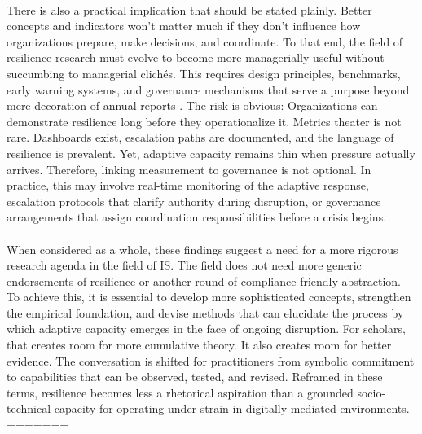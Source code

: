 \\
There is also a practical implication that should be stated plainly. Better concepts and indicators won't matter much if they don't influence how organizations prepare, make decisions, and coordinate. To that end, the field of resilience research must evolve to become more managerially useful without succumbing to managerial clichés. This requires design principles, benchmarks, early warning systems, and governance mechanisms that serve a purpose beyond mere decoration of annual reports \autocite{weick2011managing,lengnick2011developing,calder2021iso}. The risk is obvious: Organizations can demonstrate resilience long before they operationalize it. Metrics theater is not rare. Dashboards exist, escalation paths are documented, and the language of resilience is prevalent. Yet, adaptive capacity remains thin when pressure actually arrives. Therefore, linking measurement to governance is not optional. In practice, this may involve real-time monitoring of the adaptive response, escalation protocols that clarify authority during disruption, or governance arrangements that assign coordination responsibilities before a crisis begins.\\
\\
When considered as a whole, these findings suggest a need for a more rigorous research agenda in the field of IS. The field does not need more generic endorsements of resilience or another round of compliance-friendly abstraction. To achieve this, it is essential to develop more sophisticated concepts, strengthen the empirical foundation, and devise methods that can elucidate the process by which adaptive capacity emerges in the face of ongoing disruption. For scholars, that creates room for more cumulative theory. It also creates room for better evidence. The conversation is shifted for practitioners from symbolic commitment to capabilities that can be observed, tested, and revised. Reframed in these terms, resilience becomes less a rhetorical aspiration than a grounded socio-technical capacity for operating under strain in digitally mediated environments.
=======
